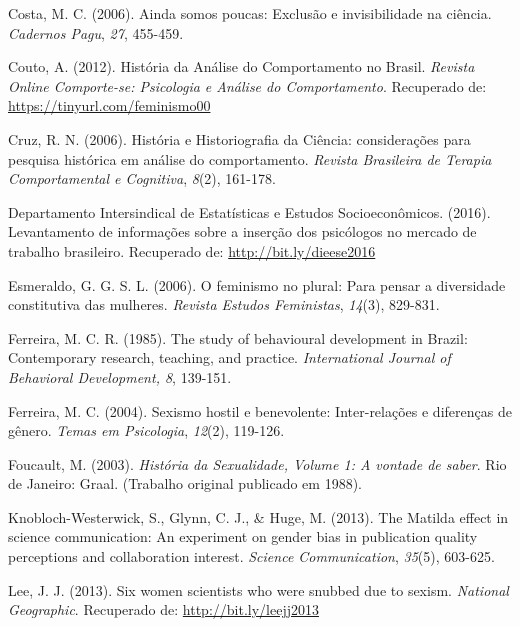 \hangindent=25pt
\noindent Costa, M. C. (2006). Ainda somos poucas: Exclusão e invisibilidade na ciência. \textit{Cadernos Pagu},\textit{ 27}, 455-459.
 
\hangindent=25pt
\noindent Couto, A. (2012). História da Análise do Comportamento no Brasil. \textit{Revista Online Comporte-se: Psicologia e Análise do Comportamento}.  Recuperado de: \url{https://tinyurl.com/feminismo00}

\hangindent=25pt
\noindent Cruz, R. N. (2006). História e Historiografia da Ciência: considerações para pesquisa histórica em análise do comportamento. \textit{Revista Brasileira de Terapia Comportamental e Cognitiva},\textit{ 8}(2), 161-178. 

\hangindent=25pt
\noindent Departamento Intersindical de Estatísticas e Estudos Socioeconômicos. (2016). Levantamento de informações sobre a inserção dos psicólogos no mercado de trabalho brasileiro. Recuperado de: \url{http://bit.ly/dieese2016}

\hangindent=25pt
\noindent Esmeraldo, G. G. S. L. (2006). O feminismo no plural: Para pensar a diversidade constitutiva das mulheres.\textit{ Revista Estudos Feministas},\textit{ 14}(3), 829-831.

\hangindent=25pt
\noindent Ferreira, M. C. R. (1985). The study of behavioural development in Brazil: Contemporary research, teaching, and practice. \textit{International Journal of Behavioral Development, 8}, 139-151.

\hangindent=25pt
\noindent Ferreira, M. C. (2004). Sexismo hostil e benevolente: Inter-relações e diferenças de gênero. \textit{Temas em Psicologia},\textit{ 12}(2), 119-126.

\hangindent=25pt
\noindent Foucault, M. (2003). \textit{História da Sexualidade, Volume 1: A vontade de saber}. Rio de Janeiro: Graal. (Trabalho original publicado em 1988).

\hangindent=25pt
\noindent Knobloch-Westerwick, S., Glynn, C. J., \& Huge, M. (2013). The Matilda effect in science communication: An experiment on gender bias in publication quality perceptions and collaboration interest. \textit{Science Communication},\textit{ 35}(5), 603-625.

\hangindent=25pt
\noindent Lee, J. J. (2013). Six women scientists who were snubbed due to sexism. \textit{National Geographic}. Recuperado de: \url{http://bit.ly/leejj2013}

